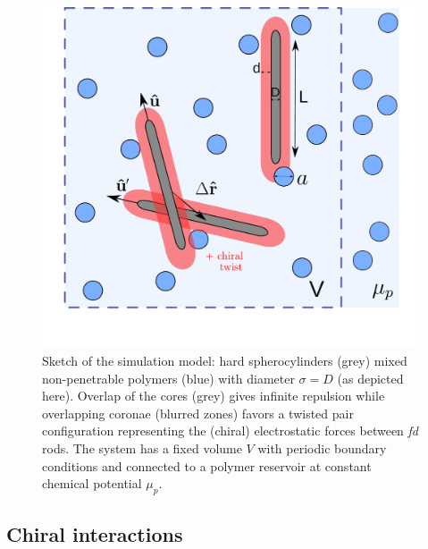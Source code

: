 \begin{figure}
	\includegraphics[width = 0.6\columnwidth]{figures/chapter-5/spheromans}
	\caption{ Sketch of the simulation model: hard spherocylinders (grey) mixed non-penetrable polymers (blue) with diameter $\sigma = D$ (as depicted here). Overlap of the cores (grey) gives infinite repulsion while overlapping coronae (blurred zones) favors a twisted pair configuration representing the (chiral) electrostatic forces between {\em fd} rods. The system has a fixed volume $V$ with periodic boundary conditions and connected to a polymer reservoir at constant chemical potential $\mu_p$. }
	\label{sketch}
\end{figure}


\subsection{Chiral interactions}

